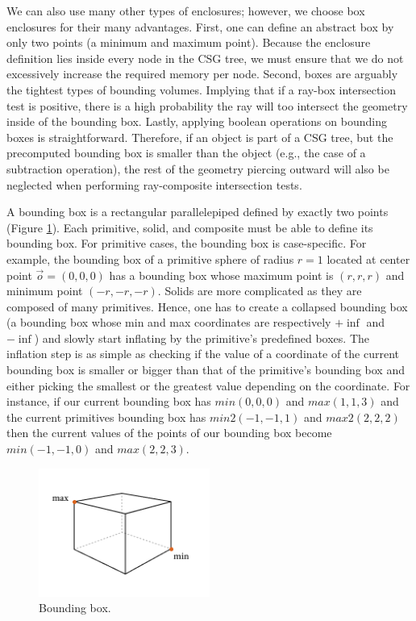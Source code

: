 \documentclass[a4paper,11pt,oneside]{article}
\begin{document}
We can also use many other types of enclosures; however, we choose box enclosures for their many advantages. First, one can define an abstract box by only two points (a minimum and maximum point). Because the enclosure definition lies inside every node in the CSG tree, we must ensure that we do not excessively increase the required memory per node. Second, boxes are arguably the tightest types of bounding volumes. Implying that if a ray-box intersection test is positive, there is a high probability the ray will too intersect the geometry inside of the bounding box. Lastly, applying boolean operations on bounding boxes is straightforward. Therefore, if an object is part of a CSG tree, but the precomputed bounding box is smaller than the object (e.g., the case of a subtraction operation), the rest of the geometry piercing outward will also be neglected when performing ray-composite intersection tests.

A bounding box is a rectangular parallelepiped defined by exactly two points (Figure \ref{sec4.2:box-points}). Each primitive, solid, and composite must be able to define its bounding box. For primitive cases, the bounding box is case-specific. For example, the bounding box of a primitive sphere of radius $r = 1$ located at center point $\vec{o} = (0, 0, 0)$ has a bounding box whose maximum point is $(r, r, r)$ and minimum point $(-r, -r, -r)$. Solids are more complicated as they are composed of many primitives. Hence, one has to create a collapsed bounding box (a bounding box whose min and max coordinates are respectively $+\inf$ and $-\inf$) and slowly start inflating by the primitive's predefined boxes. The inflation step is as simple as checking if the value of a coordinate of the current bounding box is smaller or bigger than that of the primitive's bounding box and either picking the smallest or the greatest value depending on the coordinate. For instance, if our current bounding box has $min(0, 0, 0)$ and $max(1, 1, 3)$ and the current primitives bounding box has $min2(-1, -1, 1)$ and $max2(2, 2, 2)$ then the current values of the points of our bounding box become $min(-1, -1, 0)$ and $max(2, 2, 3)$.


\begin{figure}[ht]
	\begin{center}
		\includegraphics[width=0.5\textwidth]{section4/4.2/box-enclosure-points.png}
	\end{center}
	\caption{Bounding box.}
	\label{sec4.2:box-points}
\end{figure}
\end{document}
